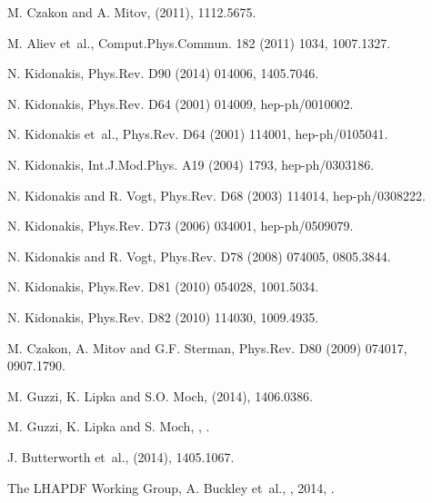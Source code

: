 \documentclass[11pt]{article}
\begin{document}
{\begin{thebibliography}{10}
M. Czakon and A. Mitov,
\newblock (2011), 1112.5675.

M. Aliev et~al.,
\newblock Comput.Phys.Commun. 182 (2011) 1034, 1007.1327.

N. Kidonakis,
\newblock Phys.Rev. D90 (2014) 014006, 1405.7046.

N. Kidonakis,
\newblock Phys.Rev. D64 (2001) 014009, hep-ph/0010002.

N. Kidonakis et~al.,
\newblock Phys.Rev. D64 (2001) 114001, hep-ph/0105041.

N. Kidonakis,
\newblock Int.J.Mod.Phys. A19 (2004) 1793, hep-ph/0303186.

N. Kidonakis and R. Vogt,
\newblock Phys.Rev. D68 (2003) 114014, hep-ph/0308222.

N. Kidonakis,
\newblock Phys.Rev. D73 (2006) 034001, hep-ph/0509079.

N. Kidonakis and R. Vogt,
\newblock Phys.Rev. D78 (2008) 074005, 0805.3844.

N. Kidonakis,
\newblock Phys.Rev. D81 (2010) 054028, 1001.5034.

N. Kidonakis,
\newblock Phys.Rev. D82 (2010) 114030, 1009.4935.

M. Czakon, A. Mitov and G.F. Sterman,
\newblock Phys.Rev. D80 (2009) 074017, 0907.1790.

M. Guzzi, K. Lipka and S.O. Moch,
\newblock (2014), 1406.0386.

M. Guzzi, K. Lipka and S. Moch,
,
.

J. Butterworth et~al.,
\newblock (2014), 1405.1067.

The LHAPDF Working Group, A. Buckley et~al.,
, 2014,
.


\end{thebibliography}}
\end{document}
